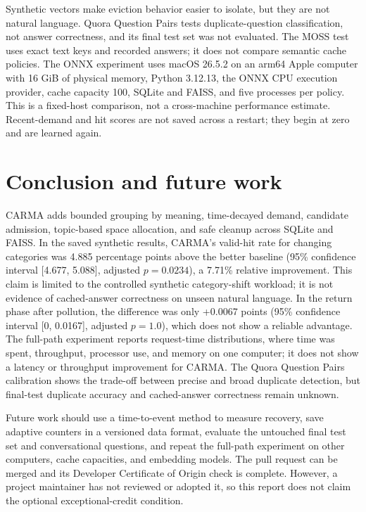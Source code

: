 \documentclass[10pt,letterpaper]{article}
\begin{document}
Synthetic vectors make eviction behavior easier to isolate, but they are not
natural language. Quora Question Pairs tests duplicate-question classification,
not answer correctness, and its final test set was not evaluated. The MOSS test
uses exact text keys and recorded answers; it does not compare semantic cache
policies. The ONNX experiment uses macOS 26.5.2 on an arm64 Apple computer with
16 GiB of physical memory, Python 3.12.13, the ONNX CPU execution provider,
cache capacity 100, SQLite and FAISS, and five processes per policy. This is a
fixed-host comparison, not a cross-machine performance estimate. Recent-demand
and hit scores are not saved across a restart; they begin at zero and are
learned again.

\section{Conclusion and future work}

CARMA adds bounded grouping by meaning, time-decayed demand, candidate
admission, topic-based space allocation, and safe cleanup across SQLite and
FAISS. In the saved synthetic results, CARMA's valid-hit rate for changing
categories was 4.885 percentage points above the better baseline (95\%
confidence interval [4.677, 5.088], adjusted $p=0.0234$), a 7.71\% relative
improvement. This claim is limited to the controlled synthetic category-shift
workload; it is not evidence of cached-answer correctness on unseen natural
language. In the return phase
after pollution, the difference was only +0.0067 points (95\% confidence
interval [0, 0.0167], adjusted $p=1.0$), which does not show a reliable
advantage. The full-path experiment reports request-time distributions, where
time was spent, throughput, processor use, and memory on one computer; it does
not show a latency or throughput improvement for CARMA. The
Quora Question Pairs calibration shows the trade-off between precise and broad
duplicate detection, but final-test duplicate accuracy and cached-answer
correctness remain unknown.

Future work should use a time-to-event method to measure recovery, save
adaptive counters in a versioned data format, evaluate the untouched final
test set and conversational questions, and repeat the full-path experiment on
other computers, cache capacities, and embedding models. The pull request can
be merged and its Developer Certificate of Origin check is complete. However,
a project maintainer has not reviewed or adopted it, so this report does not
claim the optional exceptional-credit condition.
\end{document}
